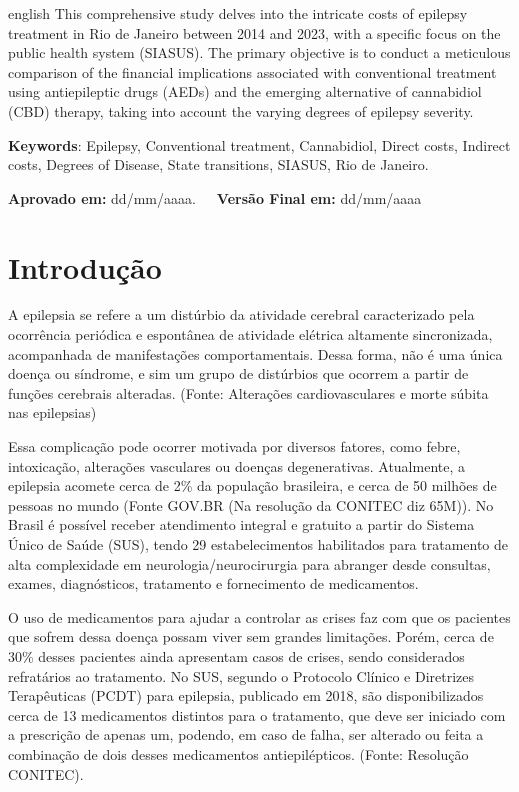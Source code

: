 \documentclass[article,a4paper,12pt,brazil,sumario=tradicional]{abntex2}
\begin{document}
\vspace{-.3cm}
\begin{hyphenrules}{english}
\noindent This comprehensive study delves into the intricate costs of epilepsy treatment in Rio de Janeiro between 2014 and 2023, with a specific focus on the public health system (SIASUS). The primary objective is to conduct a meticulous comparison of the financial implications associated with conventional treatment using antiepileptic drugs (AEDs) and the emerging alternative of cannabidiol (CBD) therapy, taking into account the varying degrees of epilepsy severity.
\end{hyphenrules}
\vspace{.4cm}
 
\noindent \textbf{Keywords}: Epilepsy, Conventional treatment, Cannabidiol, Direct costs, Indirect costs, Degrees of Disease, State transitions, SIASUS, Rio de Janeiro.

\vspace{.4cm}

\noindent \textbf{Aprovado em:} dd/mm/aaaa.~~~\textbf{Versão Final em:} dd/mm/aaaa

\section{Introdução}

A epilepsia se refere a um distúrbio da atividade cerebral caracterizado pela ocorrência periódica e espontânea de atividade elétrica altamente sincronizada, acompanhada de manifestações comportamentais. Dessa forma, não é uma única doença ou síndrome, e sim um grupo de distúrbios que ocorrem a partir de funções cerebrais alteradas. (Fonte: Alterações cardiovasculares e morte súbita nas epilepsias)

Essa complicação pode ocorrer motivada por diversos fatores, como febre, intoxicação, alterações vasculares ou doenças degenerativas. Atualmente, a epilepsia acomete cerca de 2\% da população brasileira, e cerca de 50 milhões de pessoas no mundo (Fonte GOV.BR (Na resolução da CONITEC diz 65M)). No Brasil é possível receber atendimento integral e gratuito a partir do Sistema Único de Saúde (SUS), tendo 29 estabelecimentos habilitados para tratamento de alta complexidade em neurologia/neurocirurgia para abranger desde consultas, exames, diagnósticos, tratamento e fornecimento de medicamentos.

O uso de medicamentos para ajudar a controlar as crises faz com que os pacientes que sofrem dessa doença possam viver sem grandes limitações. Porém, cerca de 30\% desses pacientes ainda apresentam casos de crises, sendo considerados refratários ao tratamento. No SUS, segundo o Protocolo Clínico e Diretrizes Terapêuticas (PCDT) para epilepsia, publicado em 2018, são disponibilizados cerca de 13 medicamentos distintos para o tratamento, que deve ser iniciado com a prescrição de apenas um, podendo, em caso de falha, ser alterado ou feita a combinação de dois desses medicamentos antiepilépticos. (Fonte: Resolução CONITEC).
\end{document}
